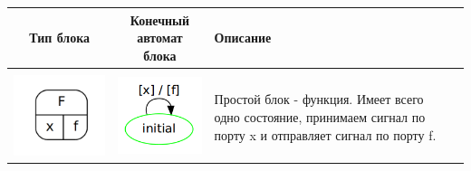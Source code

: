 \documentclass[koi8-r,usehyperref,12pt]{G7-32}
\begin{document}
\begin{table}[here]

\centering
\begin{tabular}{c|c|>{\centering}m{5cm} l}
\hline
Тип блока & Конечный автомат блока & Описание & ~\\ \hline \hline\\


\includegraphics[scale=0.25]{f_block.png}&
\includegraphics[scale=0.35]{f_fa.png}&
\footnotesize{Простой блок - функция. Имеет всего одно состояние, принимаем сигнал по порту x и отправляет сигнал по порту f.\\}& ~


\end{tabular}
\end{table}
\end{document}

